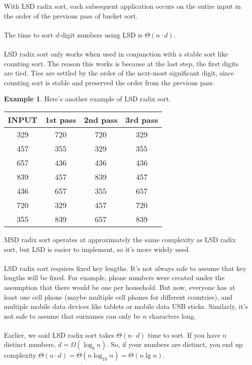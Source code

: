 \documentclass[]{article}
\theoremstyle{definition}
\newtheorem{ex}{Example}[section]
\begin{document}
					With LSD radix sort, each subsequent application occurs on the entire input in the order of the previous pass of bucket sort.
					\\ \\
					The time to sort $d$-digit numbers using LSD is $\Theta(n \cdot d)$.
					\\ \\
					LSD radix sort only works when used in conjunction with a stable sort like counting sort. The reason this works is because at the last step, the first digits are tied. Ties are settled by the order of the next-most significant digit, since counting sort is stable and preserved the order from the previous pass.
					\begin{ex} Here's another example of LSD radix sort. \\
						\begin{center}
							\begin{tabular}{|c|c|c|c|}
								\hline
								INPUT & 1st pass & 2nd pass & 3rd pass \\ \hline
								329 & 720 & 720 & 329 \\
								457 & 355 & 329 & 355 \\
								657 & 436 & 436 & 436 \\
								839 & 457 & 839 & 457 \\
								436 & 657 & 355 & 657 \\
								720 & 329 & 457 & 720 \\
								355 & 839 & 657 & 839 \\ \hline
							\end{tabular}
						\end{center}
					\end{ex}
					MSD radix sort operates at approximately the same complexity as LSD radix sort, but LSD is easier to implement, so it's more widely used. 
					\\ \\
					LSD radix sort requires fixed key lengths. It's not always safe to assume that key lengths will be fixed. For example, phone numbers were created under the assumption that there would be one per household. But now, everyone has at least one cell phone (maybe multiple cell phones for different countries), and multiple mobile data devices like tablets or mobile data USB sticks. Similarly, it's not safe to assume that surnames can only be $n$ characters long.
					\\ \\
					Earlier, we said LSD radix sort takes $\Theta(n \cdot d)$ time to sort. If you have $n$ distinct numbers, $d = \Omega(\log_b n)$. So, if your numbers are distinct, you end up complexity $\Theta(n \cdot d) = \Theta(n \log_{10} n) = \Theta(n \lg n)$.
\end{document}
